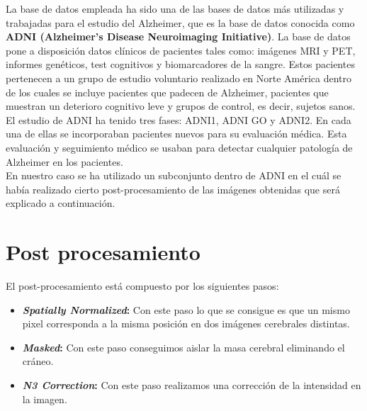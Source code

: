 
La base de datos empleada ha sido una de las bases de datos más utilizadas y trabajadas para el estudio del Alzheimer, que es la base de datos conocida como \textbf{ADNI (Alzheimer’s Disease Neuroimaging Initiative)}. La base de datos pone a disposición datos clínicos de pacientes tales como: imágenes MRI y PET, informes genéticos, test cognitivos y biomarcadores de la sangre. Estos pacientes pertenecen a un grupo de estudio voluntario realizado en Norte América dentro de los cuales se incluye pacientes que padecen de Alzheimer, pacientes que muestran un deterioro cognitivo leve y grupos de control, es decir, sujetos sanos.\\

El estudio de ADNI ha tenido tres fases: ADNI1, ADNI GO y ADNI2. En cada una de ellas se incorporaban pacientes nuevos para su evaluación médica. Esta evaluación y seguimiento médico se usaban para detectar cualquier patología de Alzheimer en los pacientes.\\

En nuestro caso se ha utilizado un subconjunto dentro de ADNI en el cuál se había realizado cierto post-procesamiento de las imágenes obtenidas que será explicado a continuación.\\
\section{Post procesamiento}

El post-procesamiento está compuesto por los siguientes pasos:
\begin{itemize}
	\item \textbf{\textit{Spatially Normalized}:} Con este paso lo que se consigue es que un mismo pixel corresponda a la misma posición en dos imágenes cerebrales distintas.
	\item \textbf{\textit{Masked}:} Con este paso conseguimos aislar la masa cerebral eliminando el cráneo. 
	\item \textbf{\textit{N3 Correction}:} Con este paso realizamos una corrección de la intensidad en la imagen.
\end{itemize}
\label{postproces}

